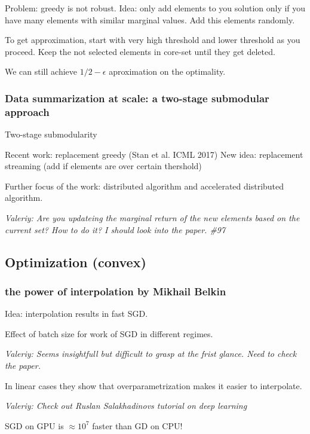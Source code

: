\documentclass[11pt,oneside,a4paper]{scrartcl}
\newcommand{\valeriy}[1]{{\color{blue}\textit{Valeriy: #1}}}
\begin{document}
Problem: greedy is not robust. Idea: only add elements to you solution
only if you have many elements with similar marginal values. Add this
elements randomly.

To get approximation, start with very high threshold and lower
threshold as you proceed. Keep the not selected elements in core-set
until they get deleted.

We can still achieve $1/2-\epsilon$ aproximation on the optimality.




\subsubsection{Data summarization at scale: a two-stage submodular
  approach \cite{mitrovic18a}}
\label{sec:dat-summarization-at}

Two-stage submodularity

Recent work: replacement greedy (Stan et al. ICML 2017)
New idea: replacement streaming (add if elements are over certain
thershold)

Further focus of the work: distributed algorithm and accelerated
distributed algorithm.

\valeriy{Are you updateing the marginal return of the new elements
  based on the current set? How to do it? I should look into the
  paper. \#97}

\subsection{Optimization (convex)}
\label{sec:optimization-convex}

\subsubsection{the power of interpolation by Mikhail Belkin \cite{ma18a}}
\label{sec:power-interpolation}

Idea: interpolation results in fast SGD.

Effect of batch size for work of SGD in different regimes.

\valeriy{Seems insightfull but difficult to grasp at the frist
  glance. Need to check the paper.}

In linear cases they show that overparametrization makes it easier to
interpolate.

\valeriy{Check out Ruslan Salakhadinovs tutorial on deep learning}

SGD on GPU is $\approx 10^7$ faster than GD on CPU!
\end{document}
